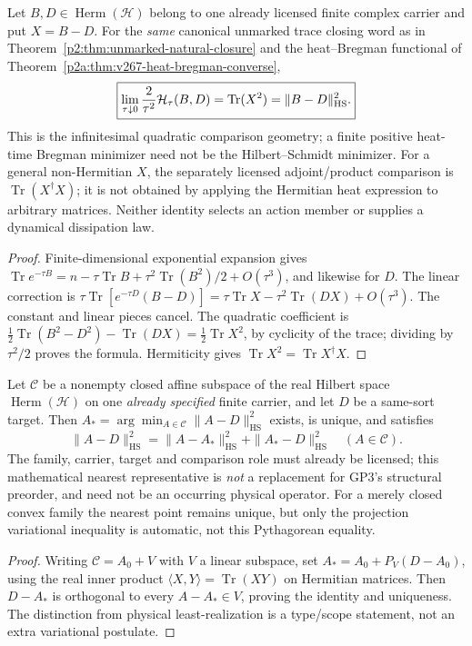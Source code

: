 \documentclass[12pt,a4paper]{article}
\begin{document}
\begin{corollary}
\label{p2a:cor:v3026-hs-heat-quadratic-limit}
Let $B,D\in\operatorname{Herm}(\mathcal H)$ belong to one already licensed
finite complex carrier and put $X=B-D$.  For the \emph{same} canonical
unmarked trace closing word as in
Theorem~\ref{p2:thm:unmarked-natural-closure} and the heat--Bregman
functional of Theorem~\ref{p2a:thm:v267-heat-bregman-converse},
\[
 \boxed{\lim_{\tau\downarrow0}\frac{2}{\tau^2}
 {\cal H}_\tau(B,D)=\operatorname{Tr}(X^2)
    =\|B-D\|_{\mathrm{HS}}^2.}
\]
This is the infinitesimal quadratic comparison geometry; a finite positive
heat-time Bregman minimizer need not be the Hilbert--Schmidt minimizer.
For a general non-Hermitian $X$, the separately licensed adjoint/product
comparison is $\operatorname{Tr}(X^\dagger X)$; it is not obtained by
applying the Hermitian heat expression to arbitrary matrices.  Neither
identity selects an action member or supplies a dynamical dissipation law.
\end{corollary}
\begin{proof}
Finite-dimensional exponential expansion gives
$\operatorname{Tr}e^{-\tau B}=n-\tau\operatorname{Tr}B+
 \tau^2\operatorname{Tr}(B^2)/2+O(\tau^3)$, and likewise for $D$.
The linear correction is
$\tau\operatorname{Tr}[e^{-\tau D}(B-D)]
=\tau\operatorname{Tr}X-\tau^2\operatorname{Tr}(DX)+O(\tau^3)$.
The constant and linear pieces cancel.  The quadratic coefficient is
$\frac12\operatorname{Tr}(B^2-D^2)-\operatorname{Tr}(DX)
=\frac12\operatorname{Tr}X^2$, by cyclicity of the trace; dividing by
$\tau^2/2$ proves the formula.  Hermiticity gives
$\operatorname{Tr}X^2=\operatorname{Tr}X^\dagger X$.
\end{proof}

\begin{corollary}
\label{p2a:cor:v3026-hs-affine-projection}
Let $\mathcal C$ be a nonempty closed affine subspace of the real
Hilbert space $\operatorname{Herm}(\mathcal H)$ on one \emph{already
specified} finite carrier, and let $D$ be a same-sort target. Then
$A_*=\arg\min_{A\in\mathcal C}\|A-D\|_{\mathrm{HS}}^2$ exists,
is unique, and satisfies
\[
 \boxed{\|A-D\|_{\mathrm{HS}}^2
 =\|A-A_*\|_{\mathrm{HS}}^2+\|A_*-D\|_{\mathrm{HS}}^2
 \quad(A\in\mathcal C).}
\]
The family, carrier, target and comparison role must already be licensed;
this mathematical nearest representative is \emph{not} a replacement for
GP3's structural preorder, and need not be an occurring physical operator.
For a merely closed convex family the nearest point remains unique, but
only the projection variational inequality is automatic, not this
Pythagorean equality.
\end{corollary}
\begin{proof}
Writing $\mathcal C=A_0+V$ with $V$ a linear subspace, set
$A_*=A_0+P_V(D-A_0)$, using the real inner product
$\langle X,Y\rangle=\operatorname{Tr}(XY)$ on Hermitian matrices.
Then $D-A_*$ is orthogonal to every $A-A_*\in V$, proving the
identity and uniqueness. The distinction from physical least-realization
is a type/scope statement, not an extra variational postulate.
\end{proof}
\end{document}
